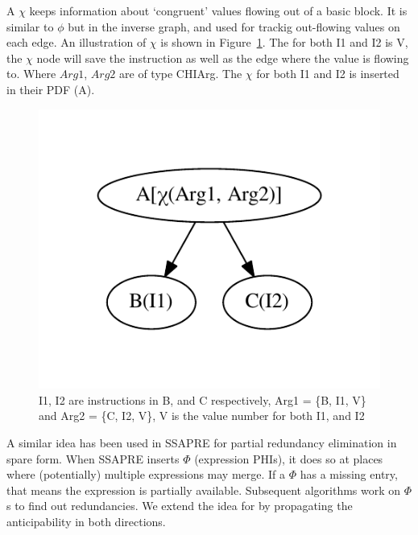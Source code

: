 \documentclass[sigplan,10pt,review,anonymous]{acmart}\settopmatter{printfolios=true,printccs=false,printacmref=false}
\begin{document}
A $\chi$ keeps information about `congruent' values flowing out of a basic
block.  It is similar to $\phi$ \cite{ssa} but in the inverse graph, and used
for trackig out-flowing values on each edge. An illustration of $\chi$ is shown
in Figure~\ref{fig:chi-intro}. The \GVN{} for both I1 and I2 is V, the $\chi$
node will save the instruction as well as the edge where the value is flowing
to.  Where $Arg1$, $Arg2$ are of type CHIArg. The $\chi$ for both I1 and I2 is
inserted in their PDF (A).


\begin{figure}
  \includegraphics[scale=0.55]{chi-example.pdf}
  \vspace*{-1.0cm}
\caption{I1, I2 are instructions in B, and C respectively, Arg1 = \{B, I1,
  V\} and Arg2 = \{C, I2, V\}, V is the value number for both I1, and I2}
\label{fig:chi-intro}
\end{figure}

A similar idea has been used in SSAPRE \cite{ssapre} for partial redundancy
elimination in spare form. When SSAPRE inserts $\Phi$ (expression PHIs), it does
so at places where (potentially) multiple expressions may merge. If a $\Phi$ has
a missing entry, that means the expression is partially available. Subsequent
algorithms work on $\Phi$s to find out redundancies. We extend the idea for
\GCM{} by propagating the anticipability in both directions.
\end{document}
